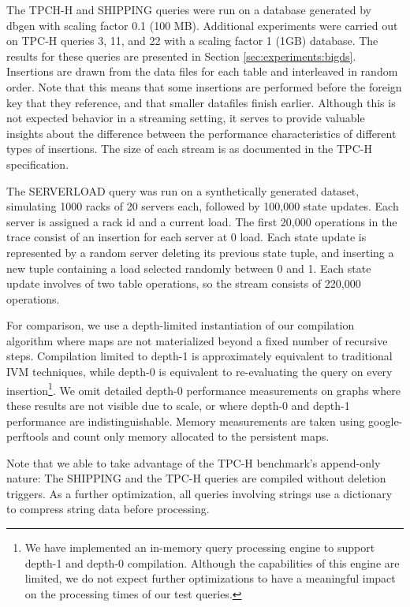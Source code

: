 The TPCH-H and SHIPPING queries were run on a database generated by dbgen\cite{tpch} with scaling factor 0.1 (100 MB).  Additional experiments were carried out on TPC-H queries 3, 11, and 22 with a scaling factor 1 (1GB) database.  The results for these queries are presented in Section \ref{sec:experiments:bigds}.  Insertions are drawn from the data files for each table and interleaved in random order.  Note that this means that some insertions are performed before the foreign key that they reference, and that smaller datafiles finish earlier.  Although this is not expected behavior in a streaming setting, it serves to provide valuable insights about the difference between the performance characteristics of different types of insertions.  The size of each stream is as documented in the TPC-H specification\cite{tpch}.

The SERVERLOAD query was run on a synthetically generated dataset, simulating 1000 racks of 20 servers each, followed by 100,000 state updates.  Each server is assigned a rack id and a current load.  The first 20,000 operations in the trace consist of an insertion for each server at 0 load.  Each state update is represented by a random server deleting its previous state tuple, and inserting a new tuple containing a load selected randomly between 0 and 1.  Each state update involves of two table operations, so the stream consists of 220,000 operations.

For comparison, we use a depth-limited instantiation of our compilation algorithm where maps are not materialized beyond a fixed number of recursive steps.  Compilation limited to depth-1 is approximately equivalent to traditional IVM techniques, while depth-0 is equivalent to re-evaluating the query on every insertion\footnote{We have implemented an in-memory query processing engine to support depth-1 and depth-0 compilation.  Although the capabilities of this engine are limited, we do not expect further optimizations  to have a meaningful impact on the processing times of our test queries.}.  We omit detailed depth-0 performance measurements on graphs where these results are not visible due to scale, or where depth-0 and depth-1 performance are indistinguishable.  Memory measurements are taken using google-perftools\cite{perftools} and count only memory allocated to the persistent maps.

Note that we able to take advantage of the TPC-H benchmark's append-only nature: The SHIPPING and the TPC-H queries are compiled without deletion triggers.  As a further optimization, all queries involving strings use a dictionary to compress string data before processing.

